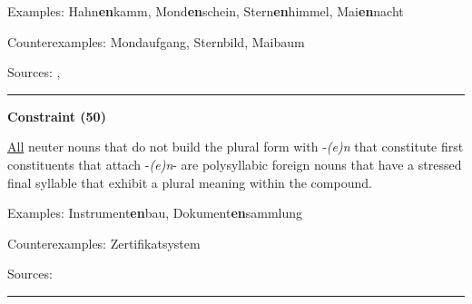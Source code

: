 \vspace{0.3em}

\noindent
Examples: Hahn\textbf{en}kamm, Mond\textbf{en}schein, Stern\textbf{en}himmel, Mai\textbf{en}nacht

\noindent
Counterexamples: Mond{\zeroLinker}aufgang, Stern{\zeroLinker}bild, Mai{\zeroLinker}baum

\vspace{0.3em}

\noindent
Sources: \citet[79, 80]{nuebling_szczepaniak_2013}, \citet[77, 78]{ortner_mueller-bollhagen_1991}


\hrule




\vspace{0.4em}

\begin{center}
\textbf{Constraint (50)}
\end{center}

\noindent
\underline{All} neuter nouns that do not build the plural form with -\textit{(e)n} that constitute first constituents that attach -\textit{(e)n}- are polysyllabic foreign nouns that have a stressed final syllable that exhibit a plural meaning within the compound.
\vspace{0.35em}


\vspace{0.3em}

\noindent
Examples: Instrument\textbf{en}bau, Dokument\textbf{en}sammlung

\noindent
Counterexamples: Zertifikat{\zeroLinker}system

\vspace{0.3em}

\noindent
Sources: \citet[78, 79]{ortner_mueller-bollhagen_1991}


\hrule




\vspace{0.4em}

